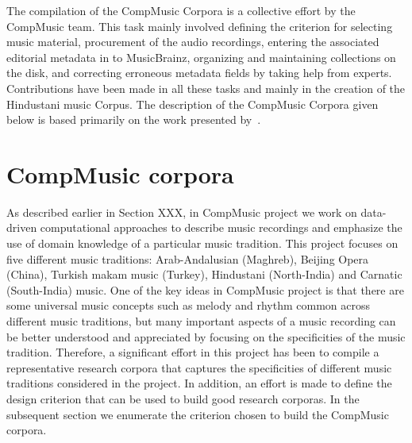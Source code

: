 The compilation of the CompMusic Corpora is a collective effort by the CompMusic team. This task mainly involved defining the criterion for selecting music material, procurement of the audio recordings, entering the associated editorial metadata in to MusicBrainz, organizing and maintaining collections on the disk, and correcting erroneous metadata fields by taking help from experts. Contributions have been made in all these tasks and mainly in the creation of the Hindustani music Corpus. The description of the CompMusic Corpora given below is based primarily on the work presented by~\cite{CM_Corpora_Ajay14,serra:14:corpus}.

%


\section{CompMusic corpora}

As described earlier in Section XXX, in CompMusic project we work on data-driven computational approaches to describe music recordings and emphasize the use of domain knowledge of a particular music tradition. This project focuses on five different music traditions: Arab-Andalusian (Maghreb), Beijing Opera (China), Turkish makam music (Turkey), Hindustani (North-India) and Carnatic (South-India) music. One of the key ideas in CompMusic project is that there are some universal music concepts such as melody and rhythm common across different music traditions, but many important aspects of a music recording can be better understood and appreciated by focusing on the specificities of the music tradition. Therefore, a significant effort in this project has been to compile a representative research corpora that captures the specificities of different music traditions considered in the project. In addition, an effort is made to define the design criterion that can be used to build good research corporas. In the subsequent section we enumerate the criterion chosen to build the CompMusic corpora.

